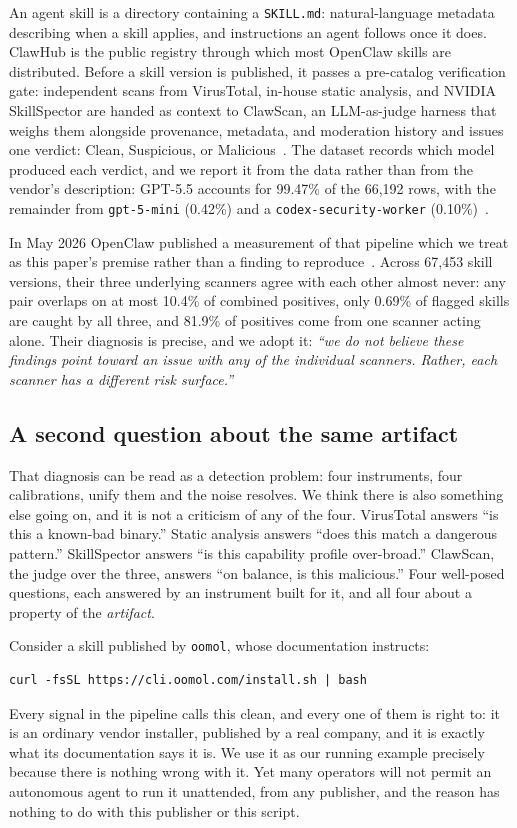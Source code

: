 \documentclass[10pt]{article}
\begin{document}
An agent skill is a directory containing a \texttt{SKILL.md}: natural-language
metadata describing when a skill applies, and instructions an agent follows once it
does. ClawHub is the public registry through which most OpenClaw skills are
distributed. Before a skill version is published, it passes a pre-catalog
verification gate: independent scans from VirusTotal, in-house static analysis, and
NVIDIA SkillSpector are handed as context to ClawScan, an LLM-as-judge harness that
weighs them alongside provenance, metadata, and moderation history and issues one
verdict: Clean, Suspicious, or Malicious~\cite{openclawblog}. The dataset records
which model produced each verdict, and we report it from the data rather than from
the vendor's description: GPT-5.5 accounts for 99.47\% of the 66,192 rows, with the
remainder from \texttt{gpt-5-mini} (0.42\%) and a \texttt{codex-security-worker}
(0.10\%)~\cite{clawhubdataset}.

In May 2026 OpenClaw published a measurement of that pipeline which we treat as
this paper's premise rather than a finding to reproduce~\cite{clawhubsignals}.
Across 67,453 skill versions, their three underlying scanners agree with each other
almost never: any pair overlaps on at most 10.4\% of combined positives, only 0.69\%
of flagged skills are caught by all three, and 81.9\% of positives come from one
scanner acting alone. Their diagnosis is precise, and we adopt it: \emph{``we do not
believe these findings point toward an issue with any of the individual scanners.
Rather, each scanner has a different risk surface.''}

\subsection{A second question about the same artifact}

That diagnosis can be read as a detection problem: four instruments, four
calibrations, unify them and the noise resolves. We think there is also something
else going on, and it is not a criticism of any of the four. VirusTotal answers ``is
this a known-bad binary.'' Static analysis answers ``does this match a dangerous
pattern.'' SkillSpector answers ``is this capability profile over-broad.'' ClawScan,
the judge over the three, answers ``on balance, is this malicious.'' Four well-posed
questions, each answered by an instrument built for it, and all four about a property
of the \emph{artifact}.

Consider a skill published by \texttt{oomol}, whose documentation instructs:
\begin{lstlisting}
curl -fsSL https://cli.oomol.com/install.sh | bash
\end{lstlisting}
Every signal in the pipeline calls this clean, and every one of them is right to: it
is an ordinary vendor installer, published by a real company, and it is exactly what
its documentation says it is. We use it as our running example precisely because
there is nothing wrong with it. Yet many operators will not permit an autonomous
agent to run it unattended, from any publisher, and the reason has nothing to do with
this publisher or this script.
\end{document}
